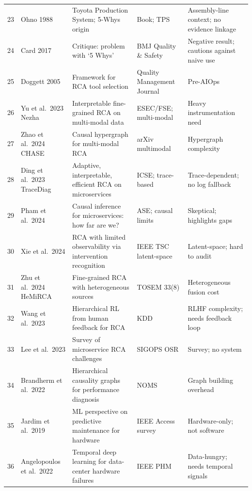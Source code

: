 \documentclass[12pt,a4paper,oneside]{report}
\begin{document}
\begin{landscape}
\begin{longtable}{p{0.6cm} p{3.2cm} p{4.2cm} p{4.2cm} p{5.5cm}}
23 & Ohno 1988 \cite{ohno1988toyota} & Toyota Production System; 5-Whys origin & Book; TPS & Assembly-line context; no evidence linkage\\
24 & Card 2017 \cite{card2017problem} & Critique: problem with `5 Whys' & BMJ Quality \& Safety & Negative result; cautions against naive use\\
25 & Doggett 2005 \cite{doggett2005root} & Framework for RCA tool selection & Quality Management Journal & Pre-AIOps\\
26 & Yu et al.\ 2023 Nezha \cite{jin2023nezha} & Interpretable fine-grained RCA on multi-modal data & ESEC/FSE; multi-modal & Heavy instrumentation need\\
27 & Zhao et al.\ 2024 CHASE \cite{sanchez2023chase} & Causal hypergraph for multi-modal RCA & arXiv multimodal & Hypergraph complexity\\
28 & Ding et al.\ 2023 TraceDiag \cite{ding2023tracediag} & Adaptive, interpretable, efficient RCA on microservices & ICSE; trace-based & Trace-dependent; no log fallback\\
29 & Pham et al.\ 2024 \cite{pham2024causal} & Causal inference for microservices: how far are we? & ASE; causal limits & Skeptical; highlights gaps\\
30 & Xie et al.\ 2024 \cite{xie2024microservice} & RCA with limited observability via intervention recognition & IEEE TSC latent-space & Latent-space; hard to audit\\
31 & Zhu et al.\ 2024 HeMiRCA \cite{zhu2024hemirca} & Fine-grained RCA with heterogeneous sources & TOSEM 33(8) & Heterogeneous fusion cost\\
32 & Wang et al.\ 2023 \cite{wang2023hierarchical} & Hierarchical RL from human feedback for RCA & KDD & RLHF complexity; needs feedback loop\\
33 & Lee et al.\ 2023 \cite{lee2022survey} & Survey of microservice RCA challenges & SIGOPS OSR & Survey; no system\\
34 & Brandherm et al.\ 2022 \cite{brandherm2022causeinfer} & Hierarchical causality graphs for performance diagnosis & NOMS & Graph building overhead\\
35 & Jardim et al.\ 2019 \cite{jardim2019predictive} & ML perspective on predictive maintenance for hardware & IEEE Access survey & Hardware-only; not software\\
36 & Angelopoulos et al.\ 2022 \cite{angelopoulos2022hardware} & Temporal deep learning for data-center hardware failures & IEEE PHM & Data-hungry; needs temporal signals\\

\end{longtable}
\end{landscape}
\end{document}
